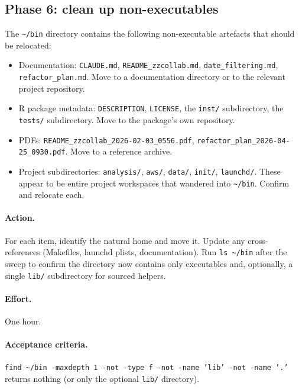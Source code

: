 \documentclass[11pt,letterpaper]{scrartcl}
\begin{document}
\subsection{Phase 6: clean up non-executables}

The \texttt{\textasciitilde/bin} directory contains the following
non-executable artefacts that should be relocated:

\begin{itemize}
  \item Documentation: \texttt{CLAUDE.md},
        \texttt{README\_zzcollab.md},
        \texttt{date\_filtering.md},
        \texttt{refactor\_plan.md}. Move to a documentation
        directory or to the relevant project repository.
  \item R package metadata: \texttt{DESCRIPTION},
        \texttt{LICENSE}, the \texttt{inst/} subdirectory, the
        \texttt{tests/} subdirectory. Move to the package's own
        repository.
  \item PDFs: \texttt{README\_zzcollab\_2026-02-03\_0556.pdf},
        \texttt{refactor\_plan\_2026-04-25\_0930.pdf}. Move to a
        reference archive.
  \item Project subdirectories: \texttt{analysis/},
        \texttt{aws/}, \texttt{data/}, \texttt{init/},
        \texttt{launchd/}. These appear to be entire project
        workspaces that wandered into \texttt{\textasciitilde/bin}.
        Confirm and relocate each.
\end{itemize}

\paragraph{Action.} For each item, identify the natural home and
move it. Update any cross-references (Makefiles, launchd plists,
documentation). Run \texttt{ls \textasciitilde/bin} after the
sweep to confirm the directory now contains only executables and,
optionally, a single \texttt{lib/} subdirectory for sourced
helpers.

\paragraph{Effort.} One hour.

\paragraph{Acceptance criteria.} \texttt{find \textasciitilde/bin
-maxdepth 1 -not -type f -not -name 'lib' -not -name '.'} returns
nothing (or only the optional \texttt{lib/} directory).
\end{document}
